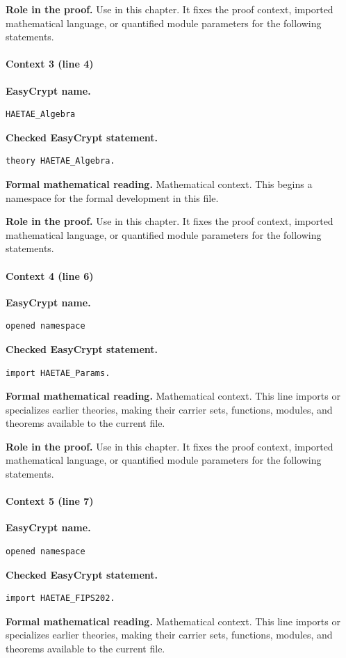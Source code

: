 \noindent\textbf{Role in the proof.}
Use in this chapter. It fixes the proof context, imported mathematical language, or quantified module parameters for the following statements.

\paragraph{Context 3 (line 4)}
\noindent\textbf{EasyCrypt name.}
\begin{lstlisting}[language=EasyCrypt,basicstyle=\ttfamily\scriptsize]
HAETAE_Algebra
\end{lstlisting}
\noindent\textbf{Checked EasyCrypt statement.}
\begin{lstlisting}[language=EasyCrypt,basicstyle=\ttfamily\scriptsize]
theory HAETAE_Algebra.
\end{lstlisting}
\noindent\textbf{Formal mathematical reading.}
Mathematical context. This begins a namespace for the formal development in this file.

\noindent\textbf{Role in the proof.}
Use in this chapter. It fixes the proof context, imported mathematical language, or quantified module parameters for the following statements.

\paragraph{Context 4 (line 6)}
\noindent\textbf{EasyCrypt name.}
\begin{lstlisting}[language=EasyCrypt,basicstyle=\ttfamily\scriptsize]
opened namespace
\end{lstlisting}
\noindent\textbf{Checked EasyCrypt statement.}
\begin{lstlisting}[language=EasyCrypt,basicstyle=\ttfamily\scriptsize]
import HAETAE_Params.
\end{lstlisting}
\noindent\textbf{Formal mathematical reading.}
Mathematical context. This line imports or specializes earlier theories, making their carrier sets, functions, modules, and theorems available to the current file.

\noindent\textbf{Role in the proof.}
Use in this chapter. It fixes the proof context, imported mathematical language, or quantified module parameters for the following statements.

\paragraph{Context 5 (line 7)}
\noindent\textbf{EasyCrypt name.}
\begin{lstlisting}[language=EasyCrypt,basicstyle=\ttfamily\scriptsize]
opened namespace
\end{lstlisting}
\noindent\textbf{Checked EasyCrypt statement.}
\begin{lstlisting}[language=EasyCrypt,basicstyle=\ttfamily\scriptsize]
import HAETAE_FIPS202.
\end{lstlisting}
\noindent\textbf{Formal mathematical reading.}
Mathematical context. This line imports or specializes earlier theories, making their carrier sets, functions, modules, and theorems available to the current file.

